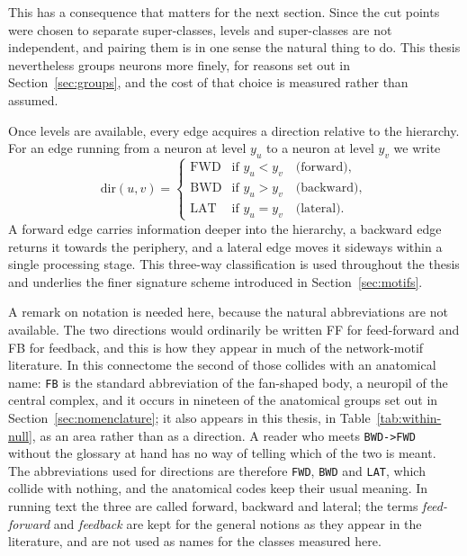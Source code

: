 \documentclass[12pt,a4paper,oneside]{article}
\theoremstyle{definition}
\theoremstyle{plain}
\newcommand{\code}[1]{\texttt{#1}}
\begin{document}
This has a consequence that matters for the next section. Since the cut
points were chosen to separate super-classes, levels and super-classes are
not independent, and pairing them is in one sense the natural thing to do.
This thesis nevertheless groups neurons more finely, for reasons set out in
Section~\ref{sec:groups}, and the cost of that choice is measured rather
than assumed.

Once levels are available, every edge acquires a direction relative to the
hierarchy. For an edge running from a neuron at level $y_u$ to a neuron at
level $y_v$ we write
\begin{equation}
  \label{eq:edge-direction}
  \mathrm{dir}(u,v) =
  \begin{cases}
    \mathrm{FWD} & \text{if } y_u < y_v \quad \text{(forward)},\\
    \mathrm{BWD} & \text{if } y_u > y_v \quad \text{(backward)},\\
    \mathrm{LAT} & \text{if } y_u = y_v \quad \text{(lateral)}.
  \end{cases}
\end{equation}
A forward edge carries information deeper into the hierarchy, a backward
edge returns it towards the periphery, and a lateral edge moves it sideways
within a single processing stage. This three-way classification is used
throughout the thesis and underlies the finer signature scheme introduced in
Section~\ref{sec:motifs}.

A remark on notation is needed here, because the natural abbreviations are
not available. The two directions would ordinarily be written FF for
feed-forward and FB for feedback, and this is how they appear in much of the
network-motif literature. In this connectome the second of those collides
with an anatomical name: \code{FB} is the standard abbreviation of the
fan-shaped body, a neuropil of the central complex, and it occurs in nineteen
of the anatomical groups set out in Section~\ref{sec:nomenclature}; it also
appears in this thesis, in Table~\ref{tab:within-null}, as an area rather
than as a direction. A reader who meets \code{BWD->FWD} without the glossary at
hand has no way of telling which of the two is meant. The abbreviations used
for directions are therefore \code{FWD}, \code{BWD} and \code{LAT}, which
collide with nothing, and the anatomical codes keep their usual meaning. In
running text the three are called forward, backward and lateral; the terms
\emph{feed-forward} and \emph{feedback} are kept for the general notions as
they appear in the literature, and are not used as names for the classes
measured here.
\end{document}
